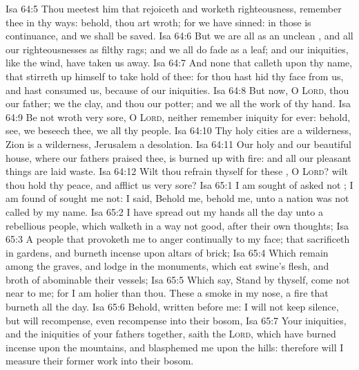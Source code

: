 \vs Isa 64:5 Thou meetest him that rejoiceth and worketh righteousness,  remember thee in thy ways: behold, thou art wroth; for we have sinned: in those is continuance, and we shall be saved.
\vs Isa 64:6 But we are all as an unclean , and all our righteousnesses  as filthy rags; and we all do fade as a leaf; and our iniquities, like the wind, have taken us away.
\vs Isa 64:7 And  none that calleth upon thy name, that stirreth up himself to take hold of thee: for thou hast hid thy face from us, and hast consumed us, because of our iniquities.
\vs Isa 64:8 But now, O \textsc{Lord}, thou  our father; we  the clay, and thou our potter; and we all  the work of thy hand.
\vs Isa 64:9 Be not wroth very sore, O \textsc{Lord}, neither remember iniquity for ever: behold, see, we beseech thee, we  all thy people.
\vs Isa 64:10 Thy holy cities are a wilderness, Zion is a wilderness, Jerusalem a desolation.
\vs Isa 64:11 Our holy and our beautiful house, where our fathers praised thee, is burned up with fire: and all our pleasant things are laid waste.
\vs Isa 64:12 Wilt thou refrain thyself for these , O \textsc{Lord}? wilt thou hold thy peace, and afflict us very sore?
\vs Isa 65:1 I am sought of  asked not ; I am found of  sought me not: I said, Behold me, behold me, unto a nation  was not called by my name.
\vs Isa 65:2 I have spread out my hands all the day unto a rebellious people, which walketh in a way  not good, after their own thoughts;
\vs Isa 65:3 A people that provoketh me to anger continually to my face; that sacrificeth in gardens, and burneth incense upon altars of brick;
\vs Isa 65:4 Which remain among the graves, and lodge in the monuments, which eat swine's flesh, and broth of abominable  their vessels;
\vs Isa 65:5 Which say, Stand by thyself, come not near to me; for I am holier than thou. These  a smoke in my nose, a fire that burneth all the day.
\vs Isa 65:6 Behold,  written before me: I will not keep silence, but will recompense, even recompense into their bosom,
\vs Isa 65:7 Your iniquities, and the iniquities of your fathers together, saith the \textsc{Lord}, which have burned incense upon the mountains, and blasphemed me upon the hills: therefore will I measure their former work into their bosom.
